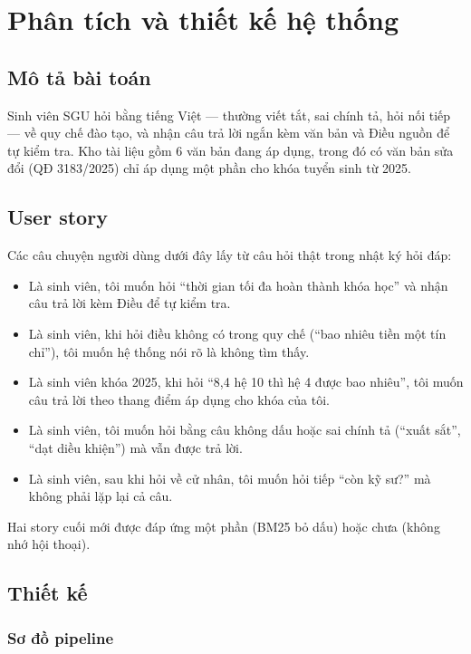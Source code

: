 \chapter{Phân tích và thiết kế hệ thống}
\label{ch:thiet-ke}

\section{Mô tả bài toán}

Sinh viên SGU hỏi bằng tiếng Việt --- thường viết tắt, sai chính tả, hỏi nối tiếp --- về quy chế đào tạo,
và nhận câu trả lời ngắn kèm văn bản và Điều nguồn để tự kiểm tra. Kho tài liệu gồm 6 văn bản đang áp
dụng, trong đó có văn bản sửa đổi (QĐ 3183/2025) chỉ áp dụng một phần cho khóa tuyển sinh từ 2025.

\section{User story}

Các câu chuyện người dùng dưới đây lấy từ câu hỏi thật trong nhật ký hỏi đáp:

\begin{itemize}
  \item Là sinh viên, tôi muốn hỏi ``thời gian tối đa hoàn thành khóa học'' và nhận câu trả lời kèm Điều để tự kiểm tra.
  \item Là sinh viên, khi hỏi điều không có trong quy chế (``bao nhiêu tiền một tín chỉ''), tôi muốn hệ thống nói rõ là không tìm thấy.
  \item Là sinh viên khóa 2025, khi hỏi ``8,4 hệ 10 thì hệ 4 được bao nhiêu'', tôi muốn câu trả lời theo thang điểm áp dụng cho khóa của tôi.
  \item Là sinh viên, tôi muốn hỏi bằng câu không dấu hoặc sai chính tả (``xuất sắt'', ``dạt diều khiện'') mà vẫn được trả lời.
  \item Là sinh viên, sau khi hỏi về cử nhân, tôi muốn hỏi tiếp ``còn kỹ sư?'' mà không phải lặp lại cả câu.
\end{itemize}

Hai story cuối mới được đáp ứng một phần (BM25 bỏ dấu) hoặc chưa (không nhớ hội thoại).

\section{Thiết kế}

\subsection{Sơ đồ pipeline}


